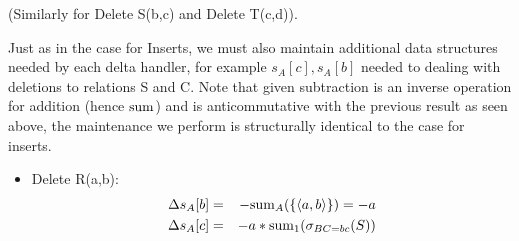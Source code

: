 {\begin{example}
(Similarly for Delete S(b,c) and Delete T(c,d)).

Just as in the case for Inserts, we must also maintain additional data
structures needed by each delta handler, for example $s_{A}[c], s_{A}[b]$ needed
to dealing with deletions to relations S and C. Note that given subtraction is an
inverse operation for addition (hence $\mathrm{sum}$) and is anticommutative with the
previous result as seen above, the maintenance we perform is
structurally identical to the case for inserts. 

\begin{itemize}
\item
Delete R(a,b):
\begin{eqnarray*}
\Delta s_{A}[b] &=& - \mathrm{sum}_{A}(\{{\langle a,b\rangle}\}) = -a\\
\Delta s_{A}[c] &=& -a * \mathrm{sum}_{1}(\sigma_{BC=bc}(S))
\end{eqnarray*}
\end{itemize}
\end{example}
} %

